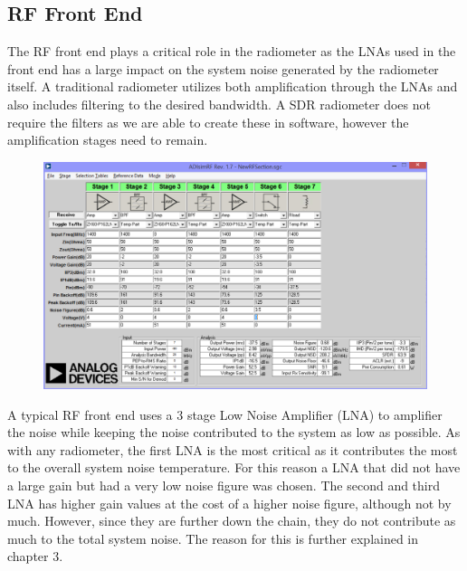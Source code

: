 \subsection{RF Front End}
The RF front end plays a critical role in the radiometer as the LNAs used in the front end has a large impact on the system noise generated by the radiometer itself.  A traditional radiometer utilizes both amplification through the LNAs and also includes filtering to the desired bandwidth.  A SDR radiometer does not require the filters as we are able to create these in software, however the amplification stages need to remain.  

{\begin{figure}[h!tb] 
\centering
\includegraphics[width=0.8\linewidth]{Images/RF_Front_end.png}
\label{ISU_Rad}
\end{figure}
}
A typical RF front end uses a 3 stage Low Noise Amplifier (LNA) to amplifier the noise while keeping the noise contributed to the system as low as possible.  As with any radiometer, the first LNA is the most critical as it contributes the most to the overall system noise temperature.  For this reason a LNA that did not have a large gain but had a very low noise figure was chosen. The second and third LNA has higher gain values at the cost of a higher noise figure, although not by much.  However, since they are further down the chain, they do not contribute as much to the total system noise.  The reason for this is further explained in chapter 3. 



